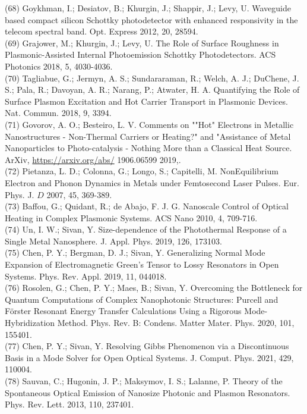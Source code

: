 \documentclass[10pt]{article}
\begin{document}
(68) Goykhman, I.; Desiatov, B.; Khurgin, J.; Shappir, J.; Levy, U. Waveguide based compact silicon Schottky photodetector with enhanced responsivity in the telecom spectral band. Opt. Express 2012, 20, 28594.\\
(69) Grajower, M.; Khurgin, J.; Levy, U. The Role of Surface Roughness in Plasmonic-Assisted Internal Photoemission Schottky Photodetectors. ACS Photonics 2018, 5, 4030-4036.\\
(70) Tagliabue, G.; Jermyn, A. S.; Sundararaman, R.; Welch, A. J.; DuChene, J. S.; Pala, R.; Davoyan, A. R.; Narang, P.; Atwater, H. A. Quantifying the Role of Surface Plasmon Excitation and Hot Carrier Transport in Plasmonic Devices. Nat. Commun. 2018, 9, 3394.\\
(71) Govorov, A. O.; Besteiro, L. V. Comments on ""Hot" Electrons in Metallic Nanostructures - Non-Thermal Carriers or Heating?" and "Assistance of Metal Nanoparticles to Photo-catalysis - Nothing More than a Classical Heat Source. ArXiv, \href{https://arxiv.org/abs/}{https://arxiv.org/abs/} 1906.06599 2019,.\\
(72) Pietanza, L. D.; Colonna, G.; Longo, S.; Capitelli, M. NonEquilibrium Electron and Phonon Dynamics in Metals under Femtosecond Laser Pulses. Eur. Phys. J. $D$ 2007, 45, 369-389.\\
(73) Baffou, G.; Quidant, R.; de Abajo, F. J. G. Nanoscale Control of Optical Heating in Complex Plasmonic Systems. ACS Nano 2010, 4, 709-716.\\
(74) Un, I. W.; Sivan, Y. Size-dependence of the Photothermal Response of a Single Metal Nanosphere. J. Appl. Phys. 2019, 126, 173103.\\
(75) Chen, P. Y.; Bergman, D. J.; Sivan, Y. Generalizing Normal Mode Expansion of Electromagnetic Green's Tensor to Lossy Resonators in Open Systems. Phys. Rev. Appl. 2019, 11, 044018.\\
(76) Rosolen, G.; Chen, P. Y.; Maes, B.; Sivan, Y. Overcoming the Bottleneck for Quantum Computations of Complex Nanophotonic Structures: Purcell and Förster Resonant Energy Transfer Calculations Using a Rigorous Mode-Hybridization Method. Phys. Rev. B: Condens. Matter Mater. Phys. 2020, 101, 155401.\\
(77) Chen, P. Y.; Sivan, Y. Resolving Gibbs Phenomenon via a Discontinuous Basis in a Mode Solver for Open Optical Systems. J. Comput. Phys. 2021, 429, 110004.\\
(78) Sauvan, C.; Hugonin, J. P.; Maksymov, I. S.; Lalanne, P. Theory of the Spontaneous Optical Emission of Nanosize Photonic and Plasmon Resonators. Phys. Rev. Lett. 2013, 110, 237401.\\
\end{document}
